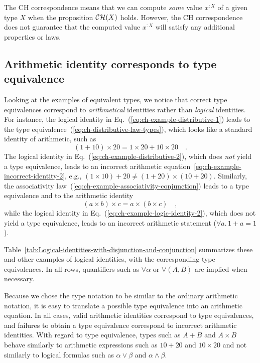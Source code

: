 The CH correspondence means that we can compute \emph{some} value
$x^{:X}$ of a given type $X$ when the proposition ${\cal CH}(X)$
holds. However, the CH correspondence does not guarantee that the
computed value $x^{:X}$ will satisfy any additional properties or
laws.

\subsection{Arithmetic identity corresponds to type equivalence}

Looking at the examples of equivalent types, we notice that correct
type equivalences correspond to \emph{arithmetical} identities rather
than \emph{logical} identities. For instance, the logical identity
in Eq.~(\ref{eq:ch-example-distributive-1}) leads to the type equivalence~(\ref{eq:ch-distributive-law-types}),
which looks like a standard identity of arithmetic, such as
\[
(1+10)\times20=1\times20+10\times20\quad.
\]
The logical identity in Eq.~(\ref{eq:ch-example-distributive-2}),
which does \emph{not} yield a type equivalence, leads to an incorrect
arithmetic equation~\ref{eq:ch-example-incorrect-identity-2}, e.g.,
$\left(1\times10\right)+20\neq\left(1+20\right)\times\left(10+20\right)$.
Similarly, the associativity law~(\ref{eq:ch-example-associativity-conjunction})
leads to a type equivalence and to the arithmetic identity
\[
\left(a\times b\right)\times c=a\times\left(b\times c\right)\quad,
\]
while the logical identity in Eq.~(\ref{eq:ch-example-logic-identity-2}),
which does not yield a type equivalence, leads to an incorrect arithmetic
statement ($\forall a.\,1+a=1$).

Table~\ref{tab:Logical-identities-with-disjunction-and-conjunction}
summarizes these and other examples of logical identities, with the
corresponding type equivalences. In all rows, quantifiers such as
$\forall\alpha$ or $\forall(A,B)$ are implied when necessary.

Because we chose the type notation to be similar to the ordinary arithmetic
notation, it is easy to translate a possible type equivalence into
an arithmetic equation. In all cases, valid arithmetic identities
correspond to type equivalences, and failures to obtain a type equivalence
correspond to incorrect arithmetic identities. With regard to type
equivalence, types such as $A+B$ and $A\times B$ behave similarly
to arithmetic expressions such as $10+20$ and $10\times20$ and not
similarly to logical formulas such as $\alpha\vee\beta$ and $\alpha\wedge\beta$.

